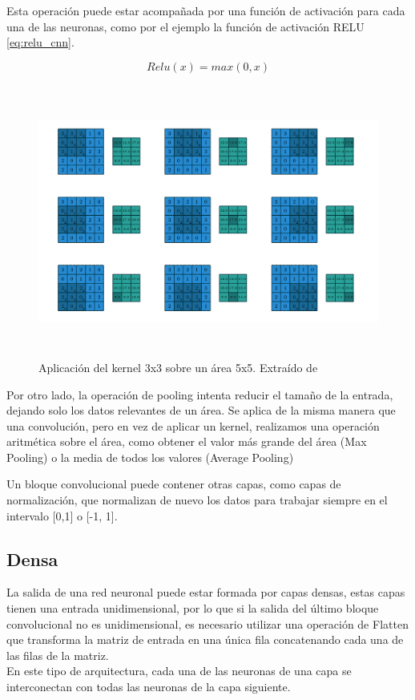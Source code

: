 Esta operación puede estar acompañada por una función de activación para
cada una de las neuronas, como por el ejemplo la función de activación
RELU \eqref{eq:relu_cnn}.

\begin{equation}
    \label{eq:relu_cnn}
    Relu(x) = max(0,x)
\end{equation}

\begin{figure}
    \centering
    \includegraphics[width=5.90556in,height=3.52639in]{img/memoria/3/convolution.png}
    \caption{Aplicación del kernel 3x3 sobre un área 5x5. Extraído de \cite{convolution_guide}}
    \label{fig:cnn_operation}
\end{figure}

Por otro lado, la operación de pooling intenta reducir el tamaño de la
entrada, dejando solo los datos relevantes de un área. Se aplica de la
misma manera que una convolución, pero en vez de aplicar un kernel,
realizamos una operación aritmética sobre el área, como obtener el valor
más grande del área (Max Pooling) o la media de todos los valores
(Average Pooling)

Un bloque convolucional puede contener otras capas, como capas de
normalización, que normalizan de nuevo los datos para trabajar siempre
en el intervalo {[}0,1{]} o [-1, 1].

\hypertarget{densa}{%
\subsection{Densa}\label{densa}}

La salida de una red neuronal puede estar formada por capas densas, estas capas
tienen una entrada unidimensional, por lo que si la salida del último
bloque convolucional no es unidimensional, es necesario utilizar una
operación de Flatten que transforma la matriz de entrada en una única
fila concatenando cada una de las filas de la matriz.\\
En este tipo de arquitectura, cada una de las neuronas de una capa se interconectan con todas las neuronas de la capa siguiente. 

